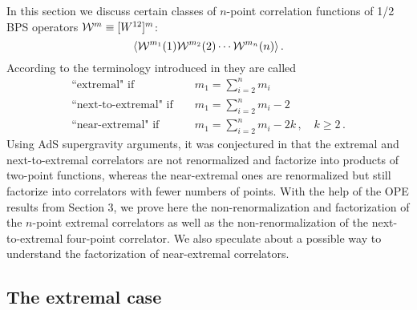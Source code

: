 \documentclass[a4paper,11pt]{article}
\begin{document}
In this section we discuss certain classes of $n$-point
correlation functions of 1/2 BPS operators ${\cal W}^m \equiv
[W^{12}]^m$:
\begin{equation}\label{e1}
  \langle {\cal W}^{m_1}(1) {\cal W}^{m_2}(2) \cdots {\cal W}^{m_n}(n) \rangle \, .
\end{equation}
According to the terminology introduced in \cite{DHoFrMaMaRa} they are called
\begin{eqnarray}
 \mbox{``extremal" if } && m_1 =\sum_{i=2}^n m_i \nonumber\\
 \mbox{``next-to-extremal" if } && m_1 =\sum_{i=2}^n m_i - 2 \label{e2} \\
 \mbox{``near-extremal" if } && m_1 =\sum_{i=2}^n m_i - 2k\,,
 \quad k\geq 2\,.       \nonumber
\end{eqnarray}
Using AdS supergravity arguments, it was conjectured in \cite{DP} that the
extremal and next-to-extremal correlators are not renormalized and factorize
into products of two-point functions, whereas the near-extremal ones are
renormalized but still factorize into correlators with fewer numbers of points.
With the help of the OPE results from Section 3, we prove here the
non-renormalization and factorization of the $n$-point extremal correlators as
well as the non-renormalization of the next-to-extremal four-point correlator.
We also speculate about a possible way to understand the factorization of
near-extremal correlators.

\subsection{The extremal case}
\end{document}
